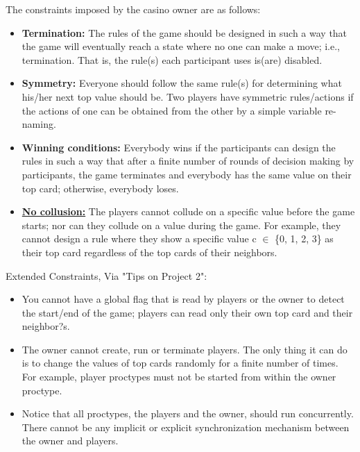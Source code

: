 \documentclass[a4paper,portrait,12pt]{article}
\begin{document}
\begin{flushleft}
The constraints imposed by the casino owner are as follows:
\end{flushleft}


\begin{itemize}
	\item \textbf{Termination:} The rules of the game should be designed in such a way that the game will eventually reach a state where no one can make a move; i.e., termination. That is, the rule(s) each participant uses is(are) disabled.
	\item \textbf{Symmetry:}  Everyone should follow the same rule(s) for determining what his/her next top value should be. Two players have symmetric rules/actions if the actions of one can be obtained from the other by a simple variable re-naming.
	\item \textbf{Winning conditions:} Everybody wins if the participants can design the rules in such a way that after a finite number of rounds of decision making by participants, the game terminates and everybody has the same value on their top card; otherwise, everybody loses.
	\item \textbf{\underline{No collusion:}} The players cannot collude on a specific value before the game starts; nor can they collude on a value during the game. For example, they cannot design a rule where they show a specific value c $\in$ \{0, 1, 2, 3\} as their top card regardless of the top cards of their neighbors.
\end{itemize}


\begin{flushleft}
Extended Constraints, Via "Tips on Project 2":
\end{flushleft}

\begin{itemize}
	\item You cannot have a global flag that is read by players or the owner to detect the start/end of the game; players can read only their own top card and their neighbor?s.
	\item The owner cannot create, run or terminate players. The only thing it can do is to change the values of top cards randomly for a finite number of times. For example, player proctypes must not be started from within the owner proctype.
	\item  Notice that all proctypes, the players and the owner, should run concurrently. There cannot be any implicit or explicit synchronization mechanism between the owner and players.
\end{itemize}
\end{document}
